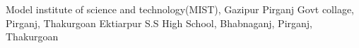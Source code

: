 
\begin{scholarship}
					{Model institute of science and technology(MIST), Gazipur}
					{Pirganj Govt collage, Pirganj, Thakurgoan}
					{Ektiarpur S.S High School, Bhabnaganj, Pirganj, Thakurgoan}
\end{scholarship}